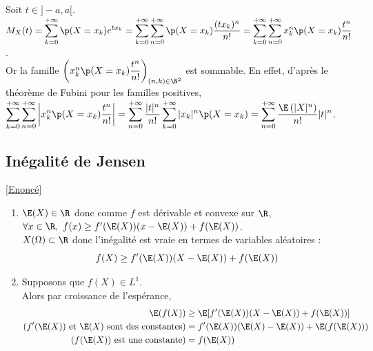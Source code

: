 \documentclass[8pt]{book}
\begin{document}
\begin{enumerate}[leftmargin=*]
		Soit $t\in ]-a,a[$.
		$M_X(t)=\displaystyle\sum\limits_{k=0}^{+\infty}\p(X=x_k)e^{tx_k}=\sum\limits_{k=0}^{+\infty}\sum\limits_{n=0}^{+\infty}\p(X=x_k)\frac{(tx_k)^n}{n!}=\sum\limits_{k=0}^{+\infty}\sum\limits_{n=0}^{+\infty}x_k^n\p(X=x_k)\frac{t^n}{n!}$.\\
		Or la famille $\left(x_k^n\p(X=x_k)\displaystyle\frac{t^n}{n!}\right)_{(n,k)\in \N^2}$ est sommable. En effet, d'après le théorème de Fubini pour les familles positives,\\
		$\displaystyle\sum\limits_{k=0}^{+\infty}\sum\limits_{n=0}^{+\infty}\left|x_k^n\p(X=x_k)\frac{t^n}{n!}\right|=\sum\limits_{n=0}^{+\infty}\frac{|t|^n}{n!}\sum\limits_{k=0}^{+\infty}|x_k|^n\p(X=x_k)=\sum\limits_{n=0}^{+\infty}\frac{\E\left(|X|^n\right)}{n!}|t|^n$.
	\end{enumerate}
	
	\subsection{Inégalité de Jensen }
	\label{Inégalité de Jensen corrigé}
		\textcolor{blue}{\hyperref[Inégalité de Jensen]{[Enoncé]}}\\
	\begin{enumerate}[leftmargin=*]
		\item $\E(X)\in \R$ donc comme $f$ est dérivable et convexe sur $\R$,\\
		$\forall x\in \R,\ f(x)\geq f'(\E(X))(x-\E(X))+f(\E(X))$.\\
		$X(\Omega)\subset \R$ donc l'inégalité est vraie en termes de variables aléatoires :
		$$f(X)\geq f'(\E(X))(X-\E(X))+f(\E(X))$$
		\item Supposons que $f(X)\in L^1$.\\
		Alors par croissance de l'espérance,
		\begin{align*}
			\E(f(X))&\geq \E[f'(\E(X))(X-\E(X))+f(\E(X))]\\
			(f'(\E(X))\text{ et } \E(X)\text{ sont des constantes})&=f'(\E(X))(\E(X)-\E(X))+\E(f(\E(X)))\\
			(f(\E(X))\text{ est une constante})&=f(\E(X))
		\end{align*}
	\end{enumerate}
	
\end{document}
